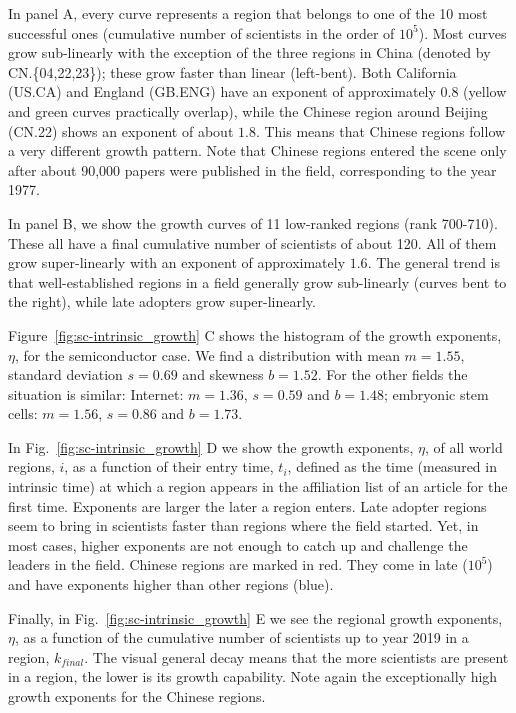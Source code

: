 \documentclass[draft,final]{vutinfth} %
\begin{document}
In panel A, every curve represents a region that belongs to one of the 10 most successful ones (cumulative number of scientists in the order of $10^5$). Most curves grow sub-linearly with the exception of the three regions in China (denoted by CN.\{04,22,23\}); these grow faster than linear (left-bent). Both California (US.CA) and England (GB.ENG) have an exponent of approximately $0.8$  (yellow and green curves practically overlap), while the Chinese region around Beijing (CN.22) shows an exponent of about $1.8$. This means that Chinese regions follow a very different growth pattern. Note that Chinese regions entered the scene only after about 90,000 papers were published in the field, corresponding to the year 1977. 

In panel B, we show the growth curves of 11 low-ranked regions (rank 700-710). These all have a final cumulative number of scientists of about 120. All of them grow super-linearly with an exponent of approximately $1.6$. The general trend is that well-established regions  in a field generally grow sub-linearly (curves bent to the right), while late adopters grow super-linearly. 

Figure~\ref{fig:sc-intrinsic_growth} C shows the histogram of the growth exponents, $\eta$, for the semiconductor case. 
We find a distribution with mean $m = 1.55$, standard deviation $s = 0.69$ and skewness $b=1.52$. 
 For the other fields the situation is similar:
 Internet: $m=1.36$, $s=0.59$ and $b=1.48$; 
 embryonic stem cells: $m=1.56$, $s=0.86$ and $b=1.73$.

In Fig.~\ref{fig:sc-intrinsic_growth} D we show the growth exponents, $\eta$, of all world regions, $i$, as a function of their entry time, $t_i$, defined as the time (measured in intrinsic time) at which a region appears in the affiliation list of an article for the first time. Exponents are larger the later a region enters. Late adopter regions seem to bring in scientists faster than regions where the field started. Yet, in most cases, higher exponents are not enough to catch up and challenge the leaders in the field. Chinese regions are marked in red. They come in late ($10^5$) and have exponents higher than other regions (blue). 

Finally, in Fig.~\ref{fig:sc-intrinsic_growth} E we see the regional growth exponents, $\eta$, as a function of the cumulative number of  scientists up to year 2019 in a region, $k_{final}$. The visual general decay means that the more scientists are present in a region, the lower is its growth capability. Note again the exceptionally high growth exponents for the Chinese regions.
\end{document}
